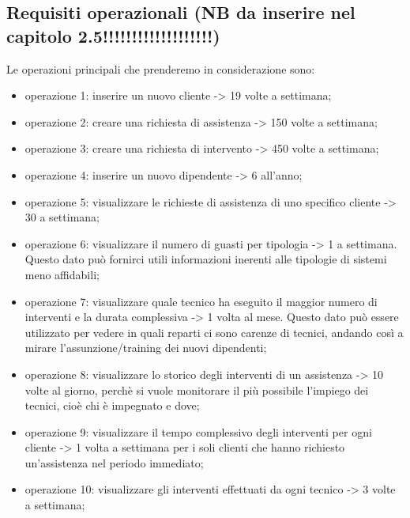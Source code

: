 \documentclass[legalpaper]{article}
\begin{document}
	\subsection{Requisiti operazionali (NB da inserire nel capitolo 2.5!!!!!!!!!!!!!!!!!!!)}
	Le operazioni principali che prenderemo in considerazione sono:
	\begin{itemize}
		\item operazione 1: inserire un nuovo cliente -> 19 volte a settimana;
		\item operazione 2: creare una richiesta di assistenza -> 150 volte a settimana;
		\item operazione 3: creare una richiesta di intervento -> 450 volte a settimana;
		\item operazione 4: inserire un nuovo dipendente -> 6 all'anno;
		\item operazione 5: visualizzare le richieste di assistenza di uno specifico cliente -> 30 a settimana;
		\item operazione 6: visualizzare il numero di guasti per tipologia -> 1 a settimana. Questo dato può fornirci utili informazioni inerenti alle tipologie di sistemi meno affidabili; 
		\item operazione 7: visualizzare quale tecnico ha eseguito il maggior numero di interventi e la durata complessiva -> 1 volta al mese. Questo dato può essere utilizzato per vedere in quali reparti ci sono carenze di tecnici, andando così a mirare l'assunzione/training dei nuovi dipendenti;
		\item operazione 8: visualizzare lo storico degli interventi di un assistenza -> 10 volte al giorno, perchè si vuole monitorare il più possibile l'impiego dei tecnici, cioè chi è impegnato e dove;
		\item operazione 9: visualizzare il tempo complessivo degli interventi per ogni cliente -> 1 volta a settimana per i soli clienti che hanno richiesto un'assistenza nel periodo immediato;
		\item operazione 10: visualizzare gli interventi effettuati da ogni tecnico -> 3 volte a settimana;
	\end{itemize}
	
	
	
	
	
	
	
			
\end{document}
